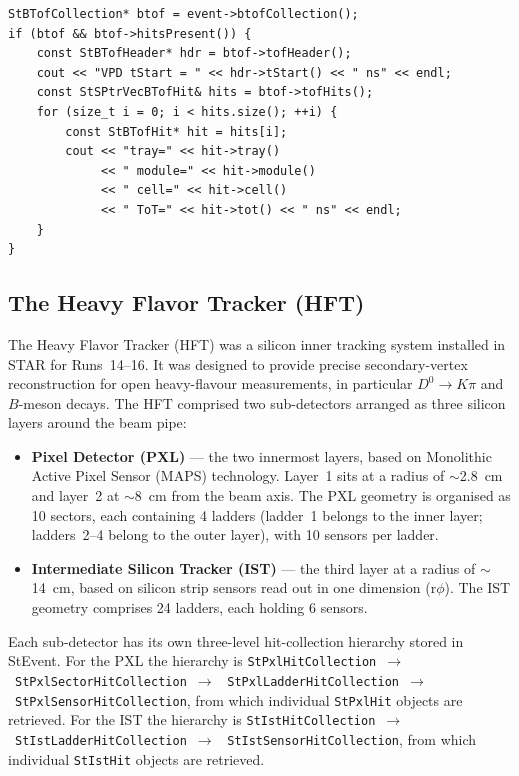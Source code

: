\documentclass[twoside]{article}
\newcommand{\StEvent}{\textsf{StEvent}}
\begin{document}
\begin{verbatim}
StBTofCollection* btof = event->btofCollection();
if (btof && btof->hitsPresent()) {
    const StBTofHeader* hdr = btof->tofHeader();
    cout << "VPD tStart = " << hdr->tStart() << " ns" << endl;
    const StSPtrVecBTofHit& hits = btof->tofHits();
    for (size_t i = 0; i < hits.size(); ++i) {
        const StBTofHit* hit = hits[i];
        cout << "tray=" << hit->tray()
             << " module=" << hit->module()
             << " cell=" << hit->cell()
             << " ToT=" << hit->tot() << " ns" << endl;
    }
}
\end{verbatim}

\subsection{The Heavy Flavor Tracker (HFT)}

The Heavy Flavor Tracker (HFT) was a silicon inner tracking system installed
in STAR for Runs~14--16.  It was designed to provide precise secondary-vertex
reconstruction for open heavy-flavour measurements, in particular
$D^0\!\to\!K\pi$ and $B$-meson decays.  The HFT comprised two sub-detectors
arranged as three silicon layers around the beam pipe:

\begin{itemize}
  \item \textbf{Pixel Detector (PXL)} --- the two innermost layers, based on
        Monolithic Active Pixel Sensor (MAPS) technology.  Layer~1 sits at a
        radius of $\sim$2.8~cm and layer~2 at $\sim$8~cm from the beam axis.
        The PXL geometry is organised as 10 sectors, each containing 4 ladders
        (ladder~1 belongs to the inner layer; ladders~2--4 belong to the outer
        layer), with 10 sensors per ladder.

  \item \textbf{Intermediate Silicon Tracker (IST)} --- the third layer at a
        radius of $\sim$14~cm, based on silicon strip sensors read out in one
        dimension (r$\phi$).  The IST geometry comprises 24 ladders, each
        holding 6 sensors.
\end{itemize}

Each sub-detector has its own three-level hit-collection hierarchy stored in
\StEvent.  For the PXL the hierarchy is
\texttt{StPxlHitCollection}~$\to$~\texttt{StPxlSectorHitCollection}~$\to$%
~\texttt{StPxlLadderHitCollection}~$\to$~\texttt{StPxlSensorHitCollection},
from which individual \texttt{StPxlHit} objects are retrieved.  For the IST
the hierarchy is
\texttt{StIstHitCollection}~$\to$~\texttt{StIstLadderHitCollection}~$\to$%
~\texttt{StIstSensorHitCollection}, from which individual \texttt{StIstHit}
objects are retrieved.
\end{document}
